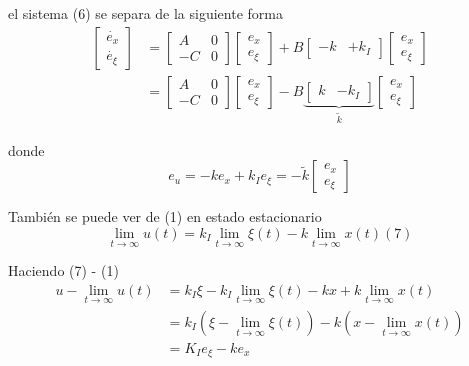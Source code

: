 el sistema (6) se separa de la siguiente forma
\[
    \begin{split}
    \begin{bmatrix}
        \dot{e_{x}} \\
        \dot{e_{\xi}}
    \end{bmatrix} & = 
    \begin{bmatrix}
        A & 0 \\
        -C & 0
    \end{bmatrix}
    \begin{bmatrix}
        e_{x} \\ 
        e_{\xi}
    \end{bmatrix}
    + B
    \begin{bmatrix}
        -k & +k_{I}
    \end{bmatrix}
    \begin{bmatrix}
        e_{x} \\ 
        e_{\xi}
    \end{bmatrix} \\
    & =
    \begin{bmatrix}
        A & 0 \\
        -C & 0
    \end{bmatrix}
    \begin{bmatrix}
        e_{x} \\ 
        e_{\xi}
    \end{bmatrix}
    - B
    \underbrace{
        \begin{bmatrix}
            k & -k_{I}
        \end{bmatrix} 
                }_{\tilde{k}}
    \begin{bmatrix}
        e_{x} \\ 
        e_{\xi}
    \end{bmatrix}
    \end{split}
\]

donde 
\[ 
    e_{u} = -ke_{x} + k_{I}e_{\xi} = -\tilde{k} \begin{bmatrix}
        e_{x} \\ e_{\xi}
    \end{bmatrix} 
\]

También se puede ver de (1) en estado estacionario
\[
    \lim_{t \to \infty} u(t) = k_{I}\lim_{t \to \infty}\xi(t) - k\lim_{t \to \infty}x(t) (7)
\]

Haciendo (7) - (1)
\[
    \begin{split}
        u - \lim_{t \to \infty} u(t) & = k_{I}\xi - k_{I}\lim_{t \to \infty}\xi(t) - kx + k\lim_{t \to \infty}x(t) \\
        & = k_{I}(\xi - \lim_{t \to \infty}\xi(t)) - k(x - \lim_{t \to \infty}x(t)) \\
        & = K_{I}e_{\xi} - ke_{x}
    \end{split}
\]

